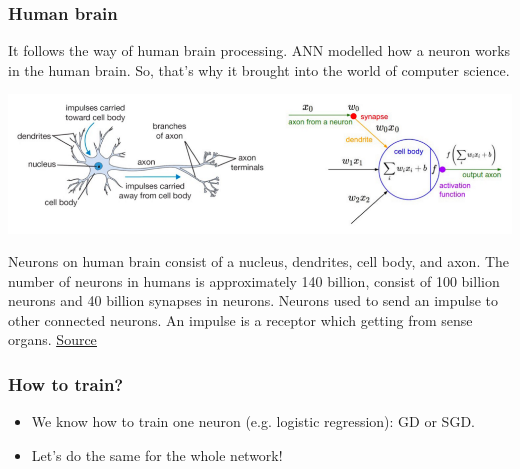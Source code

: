 \documentclass[12pt, aspectratio = 169]{beamer}
\begin{document}

\begin{frame}
	\frametitle{Human brain}
	It follows the way of human brain processing. ANN modelled how a neuron works in the human brain. So, that’s why it brought into the world of computer science.
	\begin{center}
	    \includegraphics[width=0.9\linewidth]{brain.png}   
	\end{center}
    Neurons on human brain consist of a nucleus, dendrites, cell body, and axon. The number of neurons in humans is approximately 140 billion, consist of 100 billion neurons and 40 billion synapses in neurons. Neurons used to send an impulse to other connected neurons. An impulse is a receptor which getting from sense organs. \href{https://mc.ai/get-to-know-how-artificial-neural-network-formed-in-computer-science/}{\color{blue}\uline{Source}}
\end{frame}


\begin{frame}
	\frametitle{How to train?}
	\begin{itemize}
    	\centering
	    \item We know how to train one neuron (e.g. logistic regression): GD or SGD.
	    \item Let’s do the same for the whole network!
	\end{itemize}
\end{frame}

\end{document}
